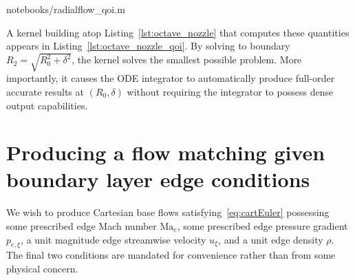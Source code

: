 \documentclass[letterpaper,11pt,nointlimits,reqno]{amsart}
\newcommand{\Mach}[1][]{\mbox{Ma}_{#1}}
\begin{document}

                {notebooks/radialflow_qoi.m}

A kernel building atop Listing~\ref{lst:octave_nozzle} that computes these
quantities appears in Listing~\ref{lst:octave_nozzle_qoi}. By solving to
boundary $R_2 = \sqrt{R_0^2 + \delta^2}$, the kernel solves the smallest
possible problem.  More importantly, it causes the ODE integrator to
automatically produce full-order accurate results at $\left(R_0,\delta\right)$
without requiring the integrator to possess dense output capabilities.

\section{Producing a flow matching given boundary layer edge conditions}

We wish to produce Cartesian base flows satisfying~\eqref{eq:cartEuler}
possessing some prescribed edge Mach number $\Mach[e]{}$, some prescribed edge
pressure gradient $p_{e,\xi}$, a unit magnitude edge streamwise velocity
$u_\xi$, and a unit edge density $\rho$. The final two conditions are mandated
for convenience rather than from some physical concern.
\end{document}
